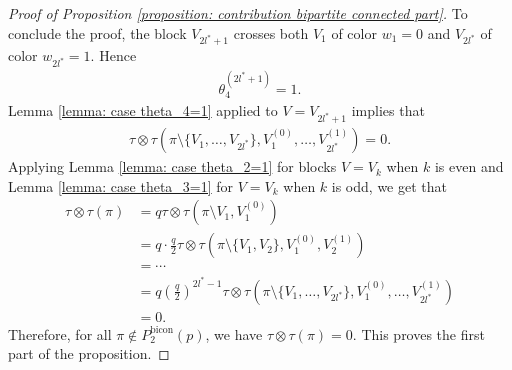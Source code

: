 \documentclass[12pt,reqno]{amsart}
\theoremstyle{plain}
\newcommand{\1}{\mathbf{1}}
\begin{document}
\begin{proof}[Proof of Proposition \ref{proposition: contribution bipartite connected part}]
    To conclude the proof, the block $V_{2l^*+1}$ crosses both $V_1$ of color $w_1=0$ and $V_{2l^*}$ of color $w_{2l^*}=1$. Hence
    \begin{align*}
        \theta^{(2l^*+1)}_4=1.
    \end{align*}
    Lemma \ref{lemma: case theta_4=1} applied to $V=V_{2l^*+1}$ implies that
    \begin{align*}
        \tau\otimes\tau\left(\pi\setminus \{V_1,\ldots,V_{2l^*}\},V_1^{(0)},\ldots,V_{2l^*}^{(1)}\right)=0. 
    \end{align*}
    Applying Lemma \ref{lemma: case theta_2=1} for blocks $V=V_k$ when $k$ is even and Lemma \ref{lemma: case theta_3=1} for $V=V_k$ when $k$ is odd, we get that
    \begin{align*}
        \tau\otimes \tau(\pi)&=q\tau\otimes \tau\left(\pi\setminus V_1,V_1^{(0)}\right)\\
        &=q\cdot \frac{q}{2}\tau\otimes \tau\left(\pi\setminus\{V_1,V_2\},V_1^{(0)},V_2^{(1)}\right)\\
        &=\cdots\\
        &=q\left(\frac{q}{2}\right)^{2l^*-1}\tau\otimes \tau\left(\pi\setminus\{V_1,\ldots,V_{2l^*}\},V_1^{(0)},\ldots,V_{2l^*}^{(1)}\right)\\
        &=0.
    \end{align*}
    Therefore, for all $\pi \notin P_2^{\operatorname{bicon}}(p)$, we have $\tau\otimes \tau(\pi)=0$. This proves the first part of the proposition.


\end{proof}
\end{document}
